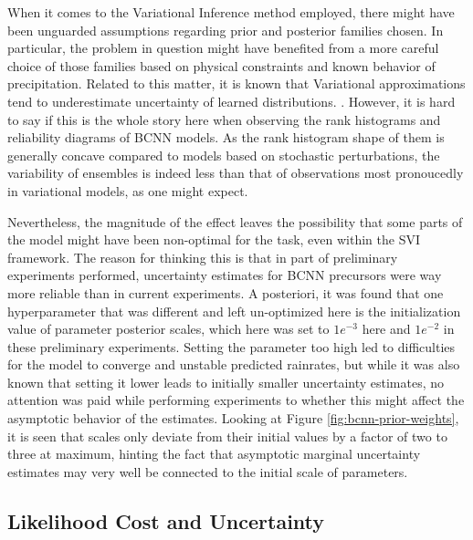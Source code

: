 When it comes to the Variational Inference method employed, there might have been unguarded assumptions regarding prior and posterior families chosen. In particular, the problem in question might have benefited from a more careful choice of those families based on physical constraints and known behavior of precipitation.   
Related to this matter, it is known that Variational approximations tend to underestimate uncertainty of learned distributions. \cite{bishop2006pattern, minka_family_nodate}. However, it is hard to say if this is the whole story here when observing the rank histograms and reliability diagrams of BCNN models. As the rank histogram shape of them is generally concave compared to models based on stochastic perturbations, the variability of ensembles is indeed less than that of observations most pronoucedly in variational models, as one might expect. 

Nevertheless, the magnitude of the effect leaves the possibility that some parts of the model might have been non-optimal for the task, even within the SVI framework. The reason for thinking this is that in part of preliminary experiments performed, uncertainty estimates for BCNN precursors were way more reliable than in current experiments. A posteriori, it was found that one hyperparameter that was different and left un-optimized here is the initialization value of parameter posterior scales, which here was set to $1e^{-3}$ here and $1e^{-2}$ in these preliminary experiments. Setting the parameter too high led to difficulties for the model to converge and unstable predicted rainrates, but while it was also known that setting it lower leads to initially smaller uncertainty estimates, no attention was paid while performing experiments to whether this might affect the asymptotic behavior of the estimates. Looking at Figure \ref{fig:bcnn-prior-weights}, it is seen that scales only deviate from their initial values by a factor of two to three at maximum, hinting the fact that asymptotic marginal uncertainty estimates may very well be connected to the initial scale of parameters. 

\subsection*{Likelihood Cost and Uncertainty}

